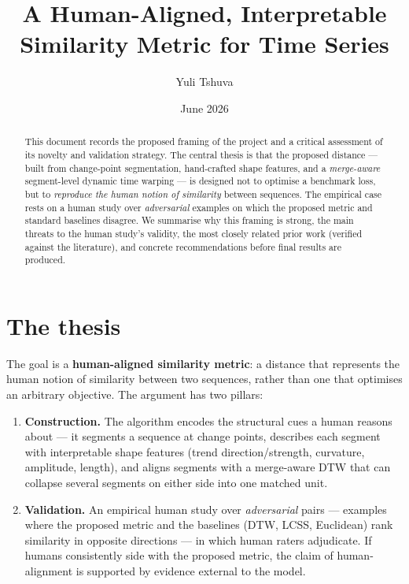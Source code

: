 \documentclass[11pt]{article}
\title{\textbf{A Human-Aligned, Interpretable Similarity Metric for Time Series}}
\author{Yuli Tshuva}
\date{June 2026}
\begin{document}
\maketitle

\begin{abstract}
\noindent
This document records the proposed framing of the project and a critical assessment
of its novelty and validation strategy. The central thesis is that the proposed
distance --- built from change-point segmentation, hand-crafted shape features, and a
\emph{merge-aware} segment-level dynamic time warping --- is designed not to optimise a
benchmark loss, but to \emph{reproduce the human notion of similarity} between sequences.
The empirical case rests on a human study over \emph{adversarial} examples on which the
proposed metric and standard baselines disagree. We summarise why this framing is strong,
the main threats to the human study's validity, the most closely related prior work
(verified against the literature), and concrete recommendations before final results are
produced.
\end{abstract}

\section{The thesis}
The goal is a \textbf{human-aligned similarity metric}: a distance that represents the
human notion of similarity between two sequences, rather than one that optimises an
arbitrary objective. The argument has two pillars:
\begin{enumerate}[leftmargin=*]
  \item \textbf{Construction.} The algorithm encodes the structural cues a human reasons
  about --- it segments a sequence at change points, describes each segment with
  interpretable shape features (trend direction/strength, curvature, amplitude, length),
  and aligns segments with a merge-aware DTW that can collapse several segments on either
  side into one matched unit.
  \item \textbf{Validation.} An empirical human study over \emph{adversarial} pairs ---
  examples where the proposed metric and the baselines (DTW, LCSS, Euclidean) rank
  similarity in opposite directions --- in which human raters adjudicate. If humans
  consistently side with the proposed metric, the claim of human-alignment is supported
  by evidence external to the model.
\end{enumerate}
\end{document}
